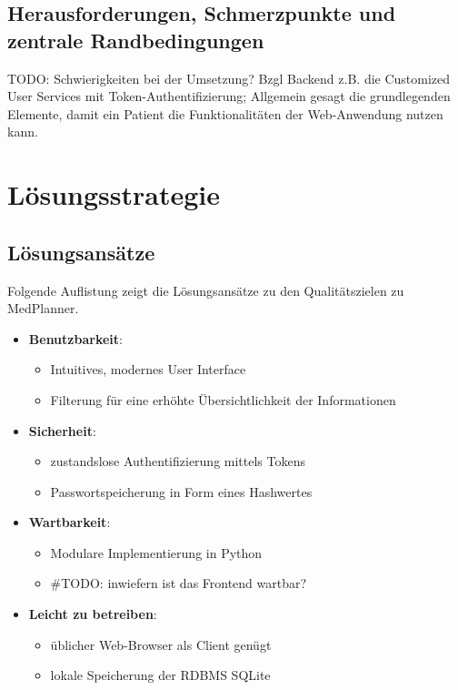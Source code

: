 \documentclass[conference]{IEEEtran}
\begin{document}
\subsection{Herausforderungen, Schmerzpunkte und zentrale Randbedingungen}
TODO: Schwierigkeiten bei der Umsetzung? Bzgl Backend z.B. die Customized User Services mit Token-Authentifizierung; Allgemein gesagt die grundlegenden Elemente, damit ein Patient die Funktionalitäten der Web-Anwendung nutzen kann.
\section{Lösungsstrategie}
\subsection{Lösungsansätze}
Folgende Auflistung zeigt die Lösungsansätze zu den Qualitätszielen zu MedPlanner.\\
\begin{itemize}
	\item \textbf{Benutzbarkeit}:
	\begin{itemize}
		\item Intuitives, modernes User Interface
		\item Filterung für eine erhöhte Übersichtlichkeit der Informationen
	\end{itemize}
	\item \textbf{Sicherheit}:
	\begin{itemize}
		\item zustandslose Authentifizierung mittels Tokens
		\item Passwortspeicherung in Form eines Hashwertes
	\end{itemize}
	\item \textbf{Wartbarkeit}:
	\begin{itemize}
		\item Modulare Implementierung in Python
		\item \#TODO: inwiefern ist das Frontend wartbar?
	\end{itemize}
	\item \textbf{Leicht zu betreiben}:
	\begin{itemize}
		\item üblicher Web-Browser als Client genügt
		\item lokale Speicherung der RDBMS SQLite
	\end{itemize}	
\end{itemize}
\end{document}
